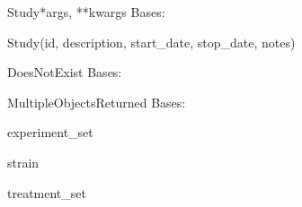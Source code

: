 \documentclass[letterpaper,10pt,english]{sphinxmanual}
\begin{document}
\hypertarget{data.models.Study}{}\begin{classdesc}{Study}{*args, **kwargs}
Bases: 

Study(id, description, start\_date, stop\_date, notes)

\hypertarget{data.models.Study.DoesNotExist}{}\begin{excdesc}{DoesNotExist}
Bases: 
\end{excdesc}

\hypertarget{data.models.Study.MultipleObjectsReturned}{}\begin{excdesc}{MultipleObjectsReturned}
Bases: 
\end{excdesc}

\hypertarget{data.models.Study.experiment_set}{}\begin{memberdesc}[Study]{experiment\_set}\end{memberdesc}

\hypertarget{data.models.Study.strain}{}\begin{memberdesc}[Study]{strain}\end{memberdesc}

\hypertarget{data.models.Study.treatment_set}{}\begin{memberdesc}[Study]{treatment\_set}\end{memberdesc}
\end{classdesc}
\end{document}
